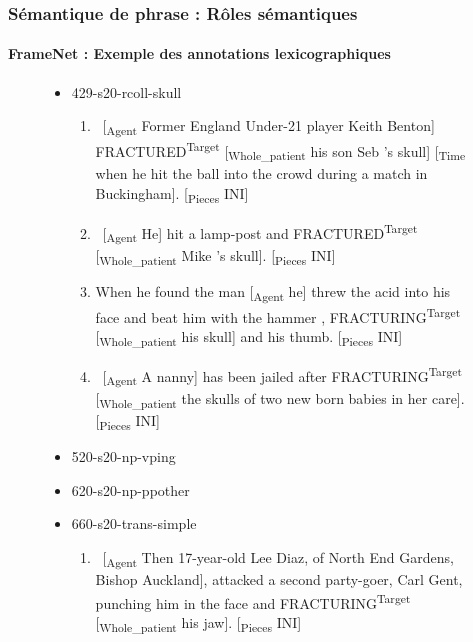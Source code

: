 \documentclass[xcolor=table]{beamer}
\begin{document}
\begin{frame}
	\frametitle{Sémantique de phrase : Rôles sémantiques}
	\framesubtitle{FrameNet : Exemple des annotations lexicographiques}
	
	\vspace{-6pt}
	\begin{figure}
		\tiny\bfseries
		
		\begin{itemize}
			\item 429-s20-rcoll-skull
			\begin{enumerate}\tiny
				\item \ [\textsubscript{\color{red}Agent} Former England Under-21 player Keith Benton] FRACTURED\textsuperscript{\color{red}Target} [\textsubscript{\color{red}Whole\_patient} his son Seb 's skull] [\textsubscript{\color{red}Time} when he hit the ball into the crowd during a match in Buckingham]. [\textsubscript{\color{red}Pieces} INI] 
				\item \ [\textsubscript{\color{red}Agent} He] hit a lamp-post and FRACTURED\textsuperscript{\color{red}Target} [\textsubscript{\color{red}Whole\_patient} Mike 's skull]. [\textsubscript{\color{red}Pieces} INI] 
				\item When he found the man [\textsubscript{\color{red}Agent} he] threw the acid into his face and beat him with the hammer , FRACTURING\textsuperscript{\color{red}Target} [\textsubscript{\color{red}Whole\_patient} his skull] and his thumb. [\textsubscript{\color{red}Pieces} INI] 
				\item \ [\textsubscript{\color{red}Agent} A nanny] has been jailed after FRACTURING\textsuperscript{\color{red}Target} [\textsubscript{\color{red}Whole\_patient} the skulls of two new born babies in her care]. [\textsubscript{\color{red}Pieces} INI] 
			\end{enumerate}
			\item 520-s20-np-vping
			\item 620-s20-np-ppother
			\item 660-s20-trans-simple
			\begin{enumerate}\tiny
				\item \ [\textsubscript{\color{red}Agent} Then 17-year-old Lee Diaz, of North End Gardens, Bishop Auckland], attacked a second party-goer, Carl Gent, punching him in the face and FRACTURING\textsuperscript{\color{red}Target} [\textsubscript{\color{red}Whole\_patient} his jaw]. [\textsubscript{\color{red}Pieces} INI] 
			\end{enumerate}
			

\end{itemize}
\end{figure}
\end{frame}
\end{document}
